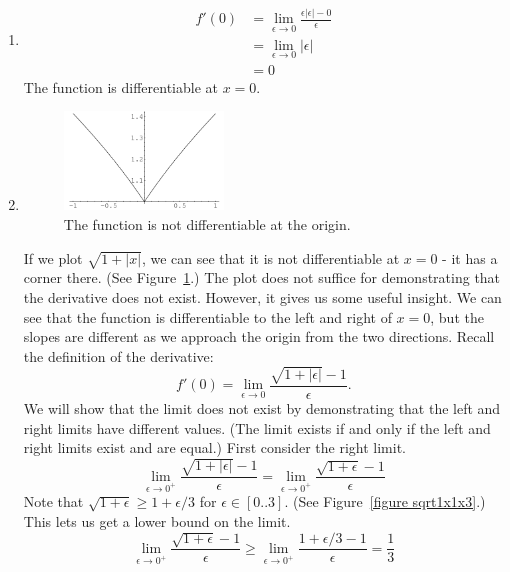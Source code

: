 \begin{Solution}
  \label{solution differentiable f = x|x|}
  \begin{enumerate}
  \item
    \begin{align*}
      f'(0) &= \lim_{\epsilon \to 0} \frac{\epsilon |\epsilon| - 0}{\epsilon}
      \\
      &= \lim_{\epsilon \to 0} |\epsilon|
      \\
      &= 0
    \end{align*}
    The function is differentiable at $x = 0$.
  \item
    \begin{figure}[tb]
      \begin{center}
        \includegraphics[width=0.4\textwidth]{calculus/differential/sqrt1x}
      \end{center}
      \caption{The function is not differentiable at the origin.}
      \label{figure sqrt1x}
    \end{figure}

    If we plot $\sqrt{1 + |x|}$, we can see that it is not differentiable 
    at $x = 0$ - it has a corner there.  
    (See Figure~\ref{figure sqrt1x}.)  The plot does not suffice for 
    demonstrating that the derivative does not exist.  However, it gives 
    us some useful insight.  We can see that the function is differentiable
    to the left and right of $x = 0$, but the slopes are different as 
    we approach the origin from the two directions.  
    Recall the definition of the derivative:
    \[
    f'(0) = \lim_{\epsilon \to 0} \frac{\sqrt{1 + |\epsilon|} - 1}{\epsilon}.
    \]
    We will show that the limit does not exist by demonstrating that 
    the left and right limits have different values.
    (The limit exists if and only if the left and right limits exist and 
    are equal.)  First consider the right limit.
    \[
    \lim_{\epsilon \to 0^+} \frac{\sqrt{1 + |\epsilon|} - 1}{\epsilon}
    = \lim_{\epsilon \to 0^+} \frac{\sqrt{1 + \epsilon} - 1}{\epsilon}
    \]
    Note that $\sqrt{1 + \epsilon} \geq 1 + \epsilon / 3$ for $\epsilon \in [0 .. 3]$.
    (See Figure~\ref{figure sqrt1x1x3}.)  This lets us get a lower bound 
    on the limit.
    \[
    \lim_{\epsilon \to 0^+} \frac{\sqrt{1 + \epsilon} - 1}{\epsilon}
    \geq \lim_{\epsilon \to 0^+} \frac{1 + \epsilon / 3 - 1}{\epsilon} = \frac{1}{3}
    \]


\end{enumerate}
\end{Solution}
